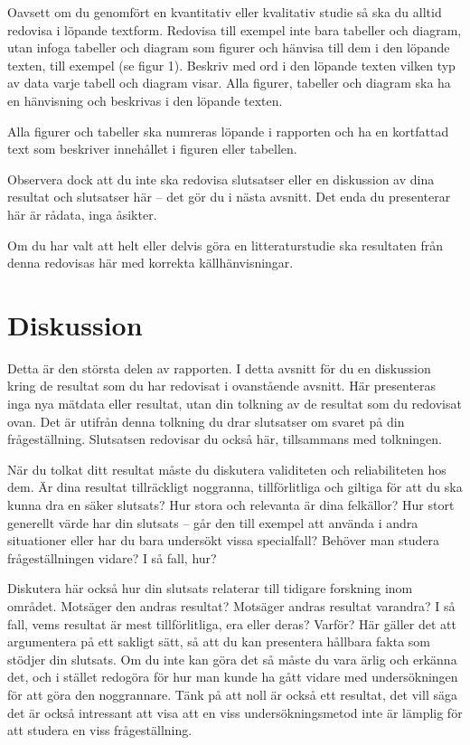 \documentclass{article}
\begin{document}
Oavsett om du genomfört en kvantitativ eller kvalitativ studie så ska du alltid redovisa i löpande textform. Redovisa till exempel inte bara tabeller och diagram, utan infoga tabeller och diagram som figurer och hänvisa till dem i den löpande texten, till exempel (se figur 1). Beskriv med ord i den löpande texten vilken typ av data varje tabell och diagram visar. Alla figurer, tabeller och diagram ska ha en hänvisning och beskrivas i den löpande texten.

Alla figurer och tabeller ska numreras löpande i rapporten och ha en kortfattad text som beskriver innehållet i figuren eller tabellen.

Observera dock att du inte ska redovisa slutsatser eller en diskussion av dina resultat och slutsatser här – det gör du i nästa avsnitt. Det enda du presenterar här är rådata, inga åsikter.

Om du har valt att helt eller delvis göra en litteraturstudie ska resultaten från denna redovisas här med korrekta källhänvisningar.

\section{Diskussion}
Detta är den största delen av rapporten. I detta avsnitt för du en diskussion kring de resultat som du har redovisat i ovanstående avsnitt. Här presenteras inga nya mätdata eller resultat, utan din tolkning av de resultat som du redovisat ovan. Det är utifrån denna tolkning du drar slutsatser om svaret på din frågeställning. Slutsatsen redovisar du också här, tillsammans med tolkningen.

När du tolkat ditt resultat måste du diskutera validiteten och reliabiliteten hos dem. Är dina resultat tillräckligt noggranna, tillförlitliga och giltiga för att du ska kunna dra en säker slutsats? Hur stora och relevanta är dina felkällor? Hur stort generellt värde har din slutsats – går den till exempel att använda i andra situationer eller har du bara undersökt vissa specialfall? Behöver man studera frågeställningen vidare? I så fall, hur?

Diskutera här också hur din slutsats relaterar till tidigare forskning inom området. Motsäger den andras resultat? Motsäger andras resultat varandra? I så fall, vems resultat är mest tillförlitliga, era eller deras? Varför? Här gäller det att argumentera på ett sakligt sätt, så att du kan presentera hållbara fakta som stödjer din slutsats. Om du inte kan göra det så måste du vara ärlig och erkänna det, och i stället redogöra för hur man kunde ha gått vidare med undersökningen för att göra den noggrannare. Tänk på att noll är också ett resultat, det vill säga det är också intressant att visa att en viss undersökningsmetod inte är lämplig för att studera en viss frågeställning.
\end{document}
